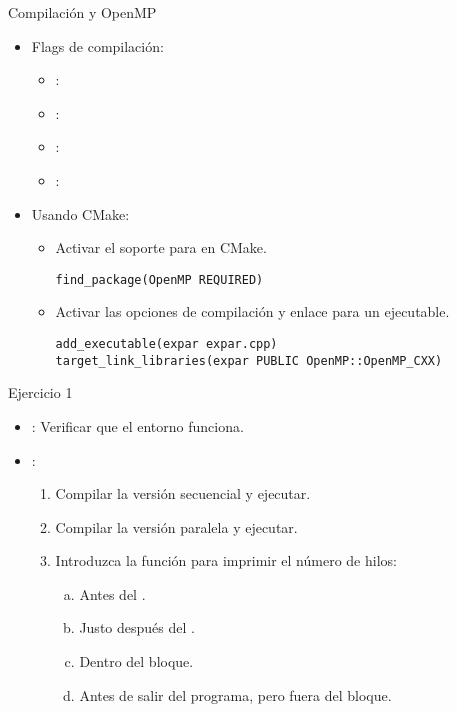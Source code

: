 \begin{frame}[t,fragile]{Compilación y OpenMP}

\begin{itemize}
  \item Flags de compilación: 
    \begin{itemize}
      \item {}: 
      \item {}: 
      \item {}: 
      \item {}: 
    \end{itemize}

  \item Usando CMake:
  \begin{itemize}
    \item Activar el soporte para  en CMake.
\begin{lstlisting}
find_package(OpenMP REQUIRED)
\end{lstlisting}

    \item Activar las opciones de compilación y enlace para un ejecutable.
\begin{lstlisting}
add_executable(expar expar.cpp)
target_link_libraries(expar PUBLIC OpenMP::OpenMP_CXX)
\end{lstlisting}
  \end{itemize}
\end{itemize}
\end{frame}

\begin{frame}[t]{Ejercicio 1}
\begin{itemize}
  \item {}: Verificar que el entorno funciona.
  
  \item {}:
  \begin{enumerate}
    \item Compilar la versión secuencial y ejecutar.
    \item Compilar la versión paralela y ejecutar.
    \item Introduzca la función  para
          imprimir el número de hilos:
      \begin{enumerate}[a)]
        \item Antes del .
        \item Justo después del .
        \item Dentro del bloque.
        \item Antes de salir del programa, pero fuera del bloque.
      \end{enumerate}
  \end{enumerate}
\end{itemize}
\end{frame}

